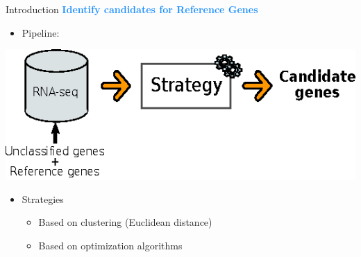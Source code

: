 \begin{frame}{Introduction}
\Large\textcolor{dodgerblue}{\textbf{Identify candidates for Reference Genes}}
\vspace{5pt}
\begin{center}
\begin{itemize}
    \normalsize
    \item Pipeline:
\end{itemize}
\vspace{13pt}
\includegraphics[scale=1.3]{figures/strategy.eps}
\vspace{18pt}
\begin{itemize}
    \normalsize
    \item Strategies
    \begin{itemize}
        \item Based on clustering (Euclidean distance)
        \vspace{3pt}
        \item Based on optimization algorithms
\end{itemize}
\end{itemize}
\end{center}
\end{frame}
